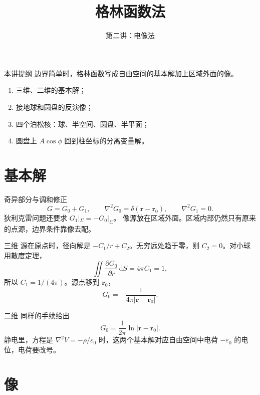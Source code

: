 \documentclass[fontset=windows, chinese, 10pt, xcolor=dvipsnames]{beamer}
\title{格林函数法}
\subtitle{第二讲：电像法}
\begin{document}
\begin{frame}
  \titlepage
\end{frame}

\begin{frame}{本讲提纲}
  边界简单时，格林函数写成自由空间的基本解加上区域外面的像。
  \begin{enumerate}
    \item 三维、二维的基本解；
    \item 接地球和圆盘的反演像；
    \item 四个泊松核：球、半空间、圆盘、半平面；
    \item 圆盘上 $A\cos\phi$ 回到柱坐标的分离变量解。
  \end{enumerate}
\end{frame}

\section{基本解}

\begin{frame}{奇异部分与调和修正}
  \[
    G=G_0+G_1,
    \qquad
    \nabla^2 G_0=\delta(\mathbf{r}-\mathbf{r}_0),
    \qquad
    \nabla^2 G_1=0.
  \]
  狄利克雷问题还要求 $G_1|_{\Sigma}=-G_0|_{\Sigma}$。
  \vspace{0.4em}
  像源放在区域外面。区域内部仍然只有原来的点源，边界条件靠像去配。
\end{frame}

\begin{frame}{三维}
  源在原点时，径向解是 $-C_1/r+C_2$。无穷远处趋于零，则 $C_2=0$。对小球用散度定理，
  \[
    \iint\frac{\partial G_0}{\partial r}\,\mathrm{d}S=4\pi C_1=1,
  \]
  所以 $C_1=1/(4\pi)$。源点移到 $\mathbf{r}_0$，
  \begin{equation*}
    \boxed{\displaystyle
      G_0=-\frac{1}{4\pi|\mathbf{r}-\mathbf{r}_0|}.}
  \end{equation*}
\end{frame}

\begin{frame}{二维}
  同样的手续给出
  \begin{equation*}
    \boxed{\displaystyle
      G_0=\frac{1}{2\pi}\ln|\mathbf{r}-\mathbf{r}_0|.}
  \end{equation*}
  静电里，方程是 $\nabla^2 V=-\rho/\varepsilon_0$ 时，这两个基本解对应自由空间中电荷 $-\varepsilon_0$ 的电位，电荷要改号。
\end{frame}

\section{像}
\end{document}
